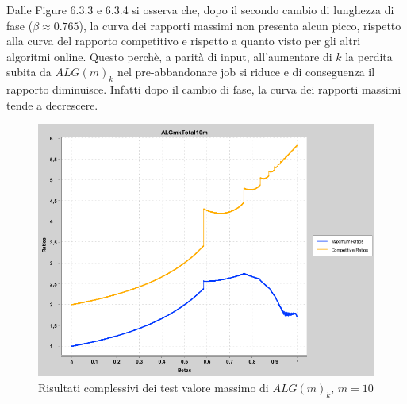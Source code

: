 \documentclass[twoside,openany,titlepage,fleqn,
	headinclude,12pt,a4paper,BCOR5mm,footinclude]{scrbook}
\begin{document}
Dalle Figure 6.3.3 e 6.3.4 si osserva che, dopo il secondo cambio di lunghezza di fase ($\beta \approx 0.765$), la curva dei rapporti massimi non presenta alcun picco, rispetto alla curva del rapporto competitivo e rispetto a quanto visto per gli altri algoritmi online. Questo perchè, a parità di input, all'aumentare di $k$ la perdita subita da $ALG(m)_{k}$ nel pre-abbandonare job si riduce e di conseguenza il rapporto diminuisce. Infatti dopo il cambio di fase, la curva dei rapporti massimi tende a decrescere.
\begin{figure}[H]
\caption[Unione test valore massimo $ALG(m)_{K}$]{Risultati complessivi dei test valore massimo di $ALG(m)_{k}$, $m = 10$}
\centering
\includegraphics[scale=0.4]{max/ALGmkTotalm10.png}
\end{figure}
 
\end{document}
